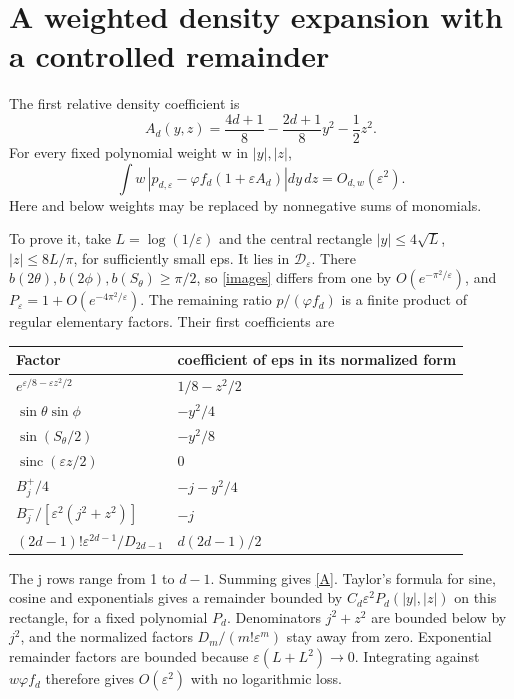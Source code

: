 \documentclass[11pt]{article}
\newcommand{\eps}{\varepsilon}
\newcommand{\sinc}{\operatorname{sinc}}
\begin{document}
\newpage
\section{A weighted density expansion with a controlled remainder}
The first relative density coefficient is
\begin{equation}\label{A}
 A_d(y,z)=\frac{4d+1}{8}-\frac{2d+1}{8}y^2-\frac12z^2.
\end{equation}
For every fixed polynomial weight w in $|y|,|z|$,
\begin{equation}\label{L1}
 \int w\,\left|p_{d,\eps}-\varphi f_d(1+\eps A_d)\right|
                 dy\,dz=O_{d,w}(\eps^2).
\end{equation}
Here and below weights may be replaced by nonnegative sums of monomials.

To prove it, take $L=\log(1/\eps)$ and the central rectangle
$|y|\le4\sqrt L$, $|z|\le8L/\pi$, for sufficiently small eps.
It lies in $\mathcal D_\eps$. There $b(2\theta),b(2\phi),
b(S_\theta)\ge\pi/2$, so \eqref{images} differs from one by
$O(e^{-\pi^2/\eps})$, and $P_\eps=1+O(e^{-4\pi^2/\eps})$.
The remaining ratio $p/(\varphi f_d)$ is a finite product of
regular elementary factors. Their first coefficients are
\begin{center}\begin{tabular}{ll}\toprule
Factor & coefficient of eps in its normalized form\\\midrule
$e^{\eps/8-\eps z^2/2}$ & $1/8-z^2/2$\\
$\sin\theta\sin\phi$ & $-y^2/4$\\
$\sin(S_\theta/2)$ & $-y^2/8$\\
$\sinc(\eps z/2)$ & $0$\\
$B_j^+/4$ & $-j-y^2/4$\\
$B_j^-/[\eps^2(j^2+z^2)]$ & $-j$\\
$(2d-1)!\eps^{2d-1}/D_{2d-1}$ & $d(2d-1)/2$\\\bottomrule
\end{tabular}\end{center}
The j rows range from 1 to $d-1$. Summing gives \eqref{A}.
Taylor's formula for sine, cosine and exponentials gives a
remainder bounded by $C_d\eps^2P_d(|y|,|z|)$ on this rectangle,
for a fixed polynomial $P_d$. Denominators $j^2+z^2$ are bounded
below by $j^2$, and the normalized factors $D_m/(m!\eps^m)$
stay away from zero. Exponential remainder factors are bounded
because $\eps(L+L^2)\to0$. Integrating against
$w\varphi f_d$ therefore gives $O(\eps^2)$ with no logarithmic loss.
\end{document}

